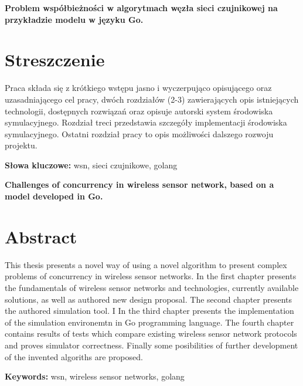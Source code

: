 \newpage
\begin{center}
\large \bf
Problem współbieżności w algorytmach węzła sieci czujnikowej na przykładzie modelu w języku Go.
\end{center}

\section*{Streszczenie}
Praca składa się z krótkiego wstępu jasno i wyczerpująco opisującego oraz uzasadniającego cel pracy, dwóch rozdziałów (2-3)
zawierających opis istniejących technologii, dostępnych rozwiązań oraz opisuje autorski system środowiska symulacyjnego.
Rozdział treci przedstawia szczegóły implementacji środowiska symulacyjnego.
Ostatni rozdział pracy to opis możliwości dalszego rozwoju projektu. 

\bigskip
{\noindent\bf Słowa kluczowe:} wsn, sieci czujnikowe, golang 

\vskip 2cm


\begin{center}
\large \bf
Challenges of concurrency in wireless sensor network, based on a model developed in Go.
\end{center}

\section*{Abstract}
This thesis presents a novel way of using a novel algorithm to present complex
problems of concurrency in wireless sensor networks. 
In the first chapter presents the fundamentals of wireless sensor networks and technologies, currently
available solutions, as well as authored new design proposal.
The second chapter presents the authored simulation tool. I
In the third chapter presents the implementation of the simulation environemtn in Go programming language. 
The fourth chapter contains results of tests which compare existing wireless sensor network protocols and proves simulator correctness.
Finally some posibilities of further development of the invented algoriths are proposed.

\bigskip
{\noindent\bf Keywords:} wsn, wireless sensor networks, golang

\vfill